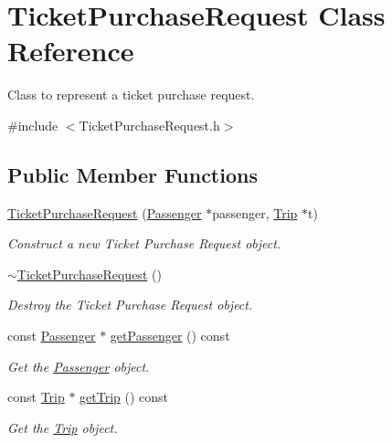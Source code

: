 \hypertarget{classTicketPurchaseRequest}{}\section{Ticket\+Purchase\+Request Class Reference}
\label{classTicketPurchaseRequest}


Class to represent a ticket purchase request.  




{\ttfamily \#include $<$Ticket\+Purchase\+Request.\+h$>$}

\subsection*{Public Member Functions}
\begin{DoxyCompactItemize}
\item 
\mbox{\hyperlink{classTicketPurchaseRequest_aaa01be19b8a8ef88428f4d1dc3a3c63c}{Ticket\+Purchase\+Request}} (\mbox{\hyperlink{classPassenger}{Passenger}} $\ast$passenger, \mbox{\hyperlink{classTrip}{Trip}} $\ast$t)
\begin{DoxyCompactList}\small\item\em Construct a new Ticket Purchase Request object. \end{DoxyCompactList}\item 
\mbox{\label{classTicketPurchaseRequest_afdd1e6ed2929ecb81dbefd1aecf22326}} 
\mbox{\hyperlink{classTicketPurchaseRequest_afdd1e6ed2929ecb81dbefd1aecf22326}{$\sim$\+Ticket\+Purchase\+Request}} ()
\begin{DoxyCompactList}\small\item\em Destroy the Ticket Purchase Request object. \end{DoxyCompactList}\item 
const \mbox{\hyperlink{classPassenger}{Passenger}} $\ast$ \mbox{\hyperlink{classTicketPurchaseRequest_a08428a7617aa26c16702420e61ce0312}{get\+Passenger}} () const
\begin{DoxyCompactList}\small\item\em Get the \mbox{\hyperlink{classPassenger}{Passenger}} object. \end{DoxyCompactList}\item 
const \mbox{\hyperlink{classTrip}{Trip}} $\ast$ \mbox{\hyperlink{classTicketPurchaseRequest_a7ae48dcccbcddb298fae1bd74048570b}{get\+Trip}} () const
\begin{DoxyCompactList}\small\item\em Get the \mbox{\hyperlink{classTrip}{Trip}} object. \end{DoxyCompactList}\item 

\end{DoxyCompactItemize}
